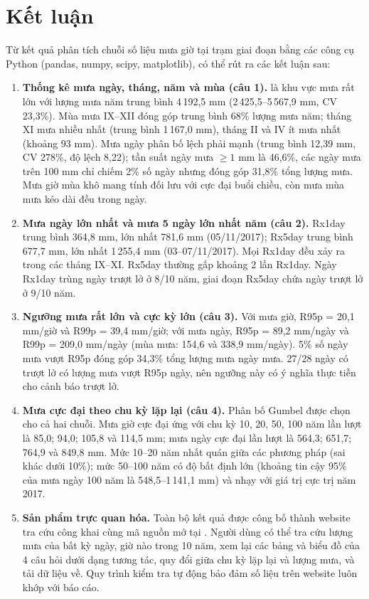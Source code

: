 \section{Kết luận}

Từ kết quả phân tích chuỗi số liệu mưa giờ tại trạm \TenTram{} giai đoạn \GiaiDoan{} bằng các công cụ Python (pandas, numpy, scipy, matplotlib), có thể rút ra các kết luận sau:

\begin{enumerate}[label=(\arabic*), leftmargin=1.2cm]
  \item \textbf{Thống kê mưa ngày, tháng, năm và mùa (câu 1).} \TenTram{} là khu vực mưa rất lớn với lượng mưa năm trung bình 4\,192,5 mm (2\,425,5--5\,567,9 mm, CV 23,3\%). Mùa mưa IX--XII đóng góp trung bình 68\% lượng mưa năm; tháng XI mưa nhiều nhất (trung bình 1\,167,0 mm), tháng II và IV ít mưa nhất (khoảng 93 mm). Mưa ngày phân bố lệch phải mạnh (trung bình 12,39 mm, CV 278\%, độ lệch 8,22); tần suất ngày mưa $\geq 1$ mm là 46,6\%, các ngày mưa trên 100 mm chỉ chiếm 2\% số ngày nhưng đóng góp 31,8\% tổng lượng mưa. Mưa giờ mùa khô mang tính đối lưu với cực đại buổi chiều, còn mưa mùa mưa kéo dài đều trong ngày.
  \item \textbf{Mưa ngày lớn nhất và mưa 5 ngày lớn nhất năm (câu 2).} Rx1day trung bình 364,8 mm, lớn nhất 781,6 mm (05/11/2017); Rx5day trung bình 677,7 mm, lớn nhất 1\,255,4 mm (03--07/11/2017). Mọi Rx1day đều xảy ra trong các tháng IX--XI. Rx5day thường gấp khoảng 2 lần Rx1day. Ngày Rx1day trùng ngày trượt lở ở 8/10 năm, giai đoạn Rx5day chứa ngày trượt lở ở 9/10 năm.
  \item \textbf{Ngưỡng mưa rất lớn và cực kỳ lớn (câu 3).} Với mưa giờ, R95p = 20,1 mm/giờ và R99p = 39,4 mm/giờ; với mưa ngày, R95p = 89,2 mm/ngày và R99p = 209,0 mm/ngày (mùa mưa: 154,6 và 338,9 mm/ngày). 5\% số ngày mưa vượt R95p đóng góp 34,3\% tổng lượng mưa ngày mưa. 27/28 ngày có trượt lở có lượng mưa vượt R95p ngày, nên ngưỡng này có ý nghĩa thực tiễn cho cảnh báo trượt lở.
  \item \textbf{Mưa cực đại theo chu kỳ lặp lại (câu 4).} Phân bố Gumbel được chọn cho cả hai chuỗi. Mưa giờ cực đại ứng với chu kỳ 10, 20, 50, 100 năm lần lượt là 85,0; 94,0; 105,8 và 114,5 mm; mưa ngày cực đại lần lượt là 564,3; 651,7; 764,9 và 849,8 mm. Mức 10--20 năm nhất quán giữa các phương pháp (sai khác dưới 10\%); mức 50--100 năm có độ bất định lớn (khoảng tin cậy 95\% của mưa ngày 100 năm là 548,5--1\,141,1 mm) và nhạy với giá trị cực trị năm 2017.
  \item \textbf{Sản phẩm trực quan hóa.} Toàn bộ kết quả được công bố thành website tra cứu công khai \WebURL{} cùng mã nguồn mở tại \GitHubURL. Người dùng có thể tra cứu lượng mưa của bất kỳ ngày, giờ nào trong 10 năm, xem lại các bảng và biểu đồ của 4 câu hỏi dưới dạng tương tác, quy đổi giữa chu kỳ lặp lại và lượng mưa, và tải dữ liệu về. Quy trình kiểm tra tự động bảo đảm số liệu trên website luôn khớp với báo cáo.
\end{enumerate}

